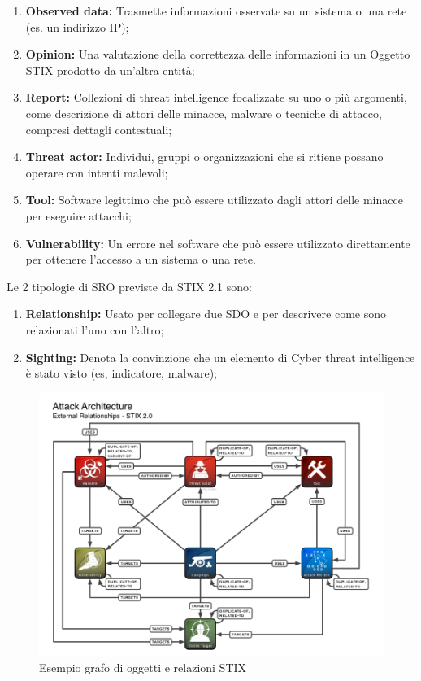 \begin{enumerate}
    \item\textbf{Observed data:} Trasmette informazioni osservate su un sistema o una rete (es. un indirizzo IP);
    \item\textbf{Opinion:} Una valutazione della correttezza delle informazioni in un Oggetto STIX prodotto da un'altra entità;
    \item\textbf{Report:} Collezioni di threat intelligence focalizzate su uno o più argomenti, come descrizione di attori delle minacce, malware o tecniche di attacco, compresi dettagli contestuali;
    \item\textbf{Threat actor:} Individui, gruppi o organizzazioni che si ritiene possano operare con intenti malevoli;
    \item\textbf{Tool:} Software legittimo che può essere utilizzato dagli attori delle minacce per eseguire attacchi;
    \item\textbf{Vulnerability:} Un errore nel software che può essere utilizzato direttamente per ottenere l’accesso a un sistema o una rete.
\end{enumerate}

Le 2 tipologie di SRO previste da STIX 2.1 sono:

\begin{enumerate}
    \item\textbf{Relationship:} Usato per collegare due SDO e per descrivere come sono relazionati l’uno con l’altro;
    \item\textbf{Sighting:} Denota la convinzione che un elemento di Cyber threat intelligence è stato visto (es, indicatore, malware);
\end{enumerate}

   \begin{figure}[h]
    \begin{center}
    \includegraphics[width=0.90\columnwidth]{images/3_CTI_img/grafoSTIX.png}
    \end{center}
    \caption{Esempio grafo di oggetti e relazioni STIX}
    \label{fig:Esempio grafo di oggetti e relazioni STIX}
    \end{figure}

